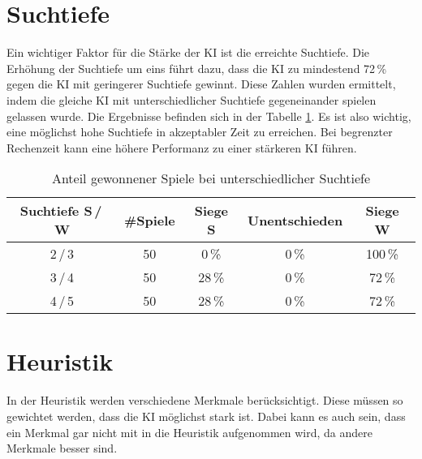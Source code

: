 
\section{Suchtiefe}
Ein wichtiger Faktor für die Stärke der KI ist die erreichte Suchtiefe. Die Erhöhung der Suchtiefe um eins führt dazu,
dass die KI zu mindestend 72\,\% gegen die KI mit geringerer Suchtiefe gewinnt. Diese Zahlen wurden ermittelt, indem die
gleiche KI mit unterschiedlicher Suchtiefe gegeneinander spielen gelassen wurde. Die Ergebnisse befinden sich in der
Tabelle \ref{table:search-depth}. Es ist also wichtig, eine möglichst hohe Suchtiefe in akzeptabler Zeit zu erreichen.
Bei begrenzter Rechenzeit kann eine höhere Performanz zu einer stärkeren KI führen.

\begin{table}[hb]
\centering
\begin{tabular}{c|c|ccc}
\hline
Suchtiefe S\,/\,W & \#Spiele & Siege S & Unentschieden & Siege W
\\ \hline
2\,/\,3 & 50 &  0\,\% &  0\,\% & 100\,\% \\
3\,/\,4 & 50 & 28\,\% &  0\,\% & 72\,\% \\
4\,/\,5 & 50 & 28\,\% &  0\,\% & 72\,\% \\
\hline
\end{tabular}
\caption{Anteil gewonnener Spiele bei unterschiedlicher Suchtiefe}
\label{table:search-depth}
\end{table}

\section{Heuristik}
In der Heuristik werden verschiedene Merkmale berücksichtigt. Diese müssen so gewichtet werden, dass die KI möglichst
stark ist. Dabei kann es auch sein, dass ein Merkmal gar nicht mit in die Heuristik aufgenommen wird, da andere Merkmale
besser sind.

